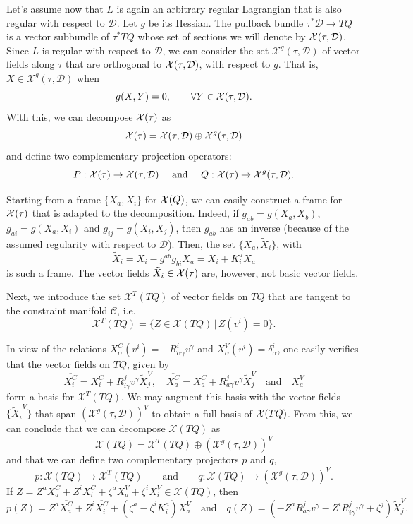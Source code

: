 \documentclass[11pt]{article}
\def\vectorfields#1{{\cal X}(#1)}
\def\D{{\mathcal D}}
\def\C{{\mathcal C}}
\begin{document}
Let's assume now that $L$ is again  an arbitrary regular Lagrangian that is also regular with respect to $\D$. Let $g$ be its Hessian. The pullback bundle $\tau^*\D \to TQ$ is a vector subbundle of $\tau^*TQ$ whose set of sections we will denote by $\vectorfields{\tau,\D}$. Since $L$ is regular with respect to $\D$, we can consider the set  ${\mathcal X}^g(\tau,\D)$  of vector fields along $\tau$ that are orthogonal to $\vectorfields{\tau,\D}$, with respect to $g$. That is, $X\in {\mathcal X}^g(\tau,\D)$ when
\[
g(X,Y)=0,\qquad \forall Y \in \vectorfields{\tau,\D}.
\]   
With this, we can decompose $\vectorfields{\tau}$ as
\[
\vectorfields{\tau} = \vectorfields{\tau,\D} \oplus {\mathcal X}^g(\tau,\D)
\]
and define two complementary projection operators: 
\[P:\vectorfields{\tau} \to \vectorfields{\tau,\D}\quad\mbox{ and }\quad Q: \vectorfields{\tau} \to {\mathcal X}^g(\tau,\D).
\]

Starting from a frame $\{X_a,X_i\}$ for $\vectorfields{Q}$, we  can easily construct a  frame for $\vectorfields{\tau}$ that is adapted to the decomposition. Indeed, if $g_{ab}=g(X_a,X_b)$, $g_{ai} = g(X_a,X_i)$ and $g_{ij} =g(X_i,X_j)$, then $g_{ab}$ has an inverse (because of the assumed regularity with respect to $\D$). Then, the set  $\{X_a, {\tilde X}_i\}$, with 
\[
\tilde{X}_i=X_i- {g}^{a b} {g}_{b i} X_a = X_i+ K^a_i X_a
\]
is such a frame. The vector fields $\tilde{X}_i\in\vectorfields{\tau}$ are, however, not basic vector fields.

Next, we introduce the set ${\mathcal X}^T(TQ)$ of vector fields  on $TQ$ that are tangent to the constraint manifold $\C$, i.e.\ 
$$
{\mathcal X}^T(TQ)=\{Z\in\mathcal{X}(TQ)\,|\, Z(v^i)=0\}.
$$

In view of the relations  $X_\alpha^C(v^i)=-R^i_{\alpha\gamma}v^\gamma$ and $X_\alpha^V(v^i)=\delta^i_\alpha$, one easily verifies that the vector fields on $TQ$, given by
\[
    \overline{X_i^C}= X_i^C+R^j_{i\gamma}v^\gamma \tilde{X}_j^V,\quad
    \overline{X_a^C}= X_a^C+R^j_{a\gamma}v^\gamma \tilde{X}_j^V \quad \mbox{and}\quad  X_a^V
\]
form a basis for ${\mathcal X}^T(TQ)$. 
We may augment this basis with the vector fields $\{{\tilde X_i}^V\}$ that span $({\mathcal X}^g(\tau,\D))^V$ to obtain a full basis of $\vectorfields{TQ}$. From this, we can conclude that we can decompose $\mathcal{X}(TQ)$ as
   $$
	{\mathcal X}(TQ)={\mathcal X}^T(TQ)\oplus ({\mathcal X}^g(\tau,\D))^V
	$$
and 
that we can define two complementary projectors $p$ and $q$,
$$p:{\mathcal X}(TQ)\rightarrow {\mathcal X}^T(TQ)\quad\quad \text{and}\quad\quad q: \mathcal{X}(TQ)\rightarrow ({\mathcal X}^g(\tau,\D))^V.$$
If $Z=Z^a X_a^C+Z^i X_i^C+\zeta^a X_a^V+\zeta^i X_i^V  \in \mathcal{X}(TQ)$, then 
\[
p(Z) = Z^a\overline{X_a^C} +Z^i\overline{X_i^C}+ (\zeta^a-\zeta^i K_i^a) X_a^V\quad \mbox{and} \quad q(Z)= (-Z^a R^j_{a\gamma}v^\gamma-Z^i R^j_{i\gamma}v^\gamma+\zeta^j)\tilde{X}_j^V.
\]
\end{document}
